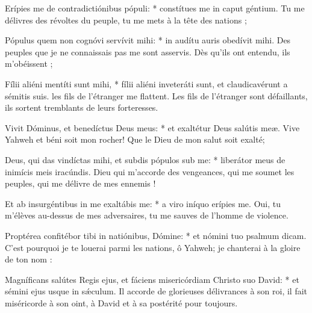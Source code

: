 \begin{paracol}{2}
\LigneParacol
{Erípies me de contradictiónibus pópuli: * constítues me in caput géntium.}
{Tu me délivres des révoltes du peuple, tu me mets à la tête des nations ;}

\LigneParacol
{Pópulus quem non cognóvi servívit mihi: * in audítu auris obedívit mihi.}
{Des peuples que je ne connaissais pas me sont asservis. Dès qu'ils ont entendu, ils m'obéissent ;}

\LigneParacol
{Fílii aliéni mentíti sunt mihi, * fílii aliéni inveteráti sunt, et claudicavérunt a sémitis suis.}
{les fils de l'étranger me flattent. Les fils de l'étranger sont défaillants, ils sortent tremblants de leurs forteresses. }

\LigneParacol
{Vivit Dóminus, et benedíctus Deus meus: * et exaltétur Deus salútis meæ.}
{Vive Yahweh et béni soit mon rocher! Que le Dieu de mon salut soit exalté; }

\LigneParacol
{Deus, qui das vindíctas mihi, et subdis pópulos sub me: * liberátor meus de inimícis meis iracúndis.}
{Dieu qui m'accorde des vengeances, qui me soumet les peuples, qui me délivre de mes ennemis !}

\LigneParacol
{Et ab insurgéntibus in me exaltábis me: * a viro iníquo erípies me.}
{Oui, tu m'élèves au-dessus de mes adversaires, tu me sauves de l'homme de violence. }

\LigneParacol
{Proptérea confitébor tibi in natiónibus, Dómine: * et nómini tuo psalmum dicam.}
{C'est pourquoi je te louerai parmi les nations, ô Yahweh; je chanterai à la gloire de ton nom :}

\LigneParacol
{Magníficans salútes Regis ejus, et fáciens misericórdiam Christo suo David: * et sémini ejus usque in sǽculum.}
{Il accorde de glorieuses délivrances à son roi, il fait miséricorde à son oint, à David et à sa postérité pour toujours. }

\end{paracol}
